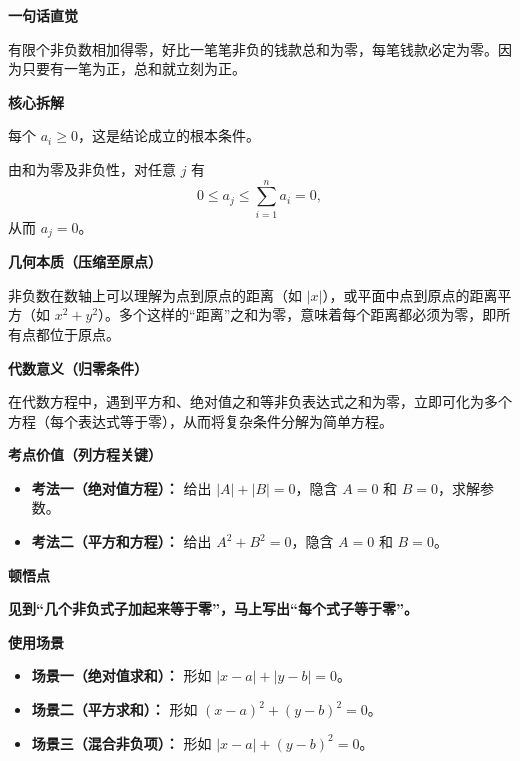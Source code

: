 \begin{explanationbox}
	\textbf{\textcolor{CExplanation}{一句话直觉}}

	有限个非负数相加得零，好比一笔笔非负的钱款总和为零，每笔钱款必定为零。因为只要有一笔为正，总和就立刻为正。

	\medskip
	\textbf{\textcolor{CExplanation}{核心拆解}}
	\begin{description}[style=nextline, leftmargin=2.8em, labelsep=0.5em, itemsep=0.45em]
		\item[\textbf{要点一（非负性前提）：}]
		      每个 $a_i\ge0$，这是结论成立的根本条件。
		\item[\textbf{要点二（夹逼推导）：}]
		      由和为零及非负性，对任意 $j$ 有
		      \[
			      0\le a_j\le \sum_{i=1}^n a_i=0,
		      \]
		      从而 $a_j=0$。
	\end{description}

	\medskip
	\textbf{\textcolor{CExplanation}{几何本质（压缩至原点）}}

	非负数在数轴上可以理解为点到原点的距离（如 $|x|$），或平面中点到原点的距离平方（如 $x^2+y^2$）。多个这样的“距离”之和为零，意味着每个距离都必须为零，即所有点都位于原点。

	\medskip
	\textbf{\textcolor{CExplanation}{代数意义（归零条件）}}

	在代数方程中，遇到平方和、绝对值之和等非负表达式之和为零，立即可化为多个方程（每个表达式等于零），从而将复杂条件分解为简单方程。

	\medskip
	\textbf{\textcolor{CExplanation}{考点价值（列方程关键）}}
	\begin{itemize}[leftmargin=*, itemsep=0.5em, topsep=0.4em]
		\item \textbf{考法一（绝对值方程）：} 给出 $|A|+|B|=0$，隐含 $A=0$ 和 $B=0$，求解参数。
		\item \textbf{考法二（平方和方程）：} 给出 $A^2+B^2=0$，隐含 $A=0$ 和 $B=0$。
	\end{itemize}

	\medskip
	\textbf{\textcolor{CExplanation}{顿悟点}}

	\textbf{见到“几个非负式子加起来等于零”，马上写出“每个式子等于零”。}

	\medskip
	\textbf{\textcolor{CExplanation}{使用场景}}
	\begin{itemize}[leftmargin=*, itemsep=0.5em, topsep=0.4em]
		\item \textbf{场景一（绝对值求和）：} 形如 $|x-a|+|y-b|=0$。
		\item \textbf{场景二（平方求和）：} 形如 $(x-a)^2+(y-b)^2=0$。
		\item \textbf{场景三（混合非负项）：} 形如 $|x-a|+(y-b)^2=0$。
	\end{itemize}
\end{explanationbox}